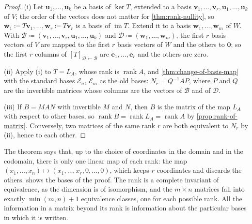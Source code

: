 \begin{proof}
(i) Let $\mathbf u_1,\ldots,\mathbf u_k$ be a basis of $\ker T$, extended to a basis $\mathbf v_1,\ldots,\mathbf v_r,\mathbf u_1,\ldots,\mathbf u_k$ of $V$; the order of the vectors does not matter for \cref{thm:rank-nullity}, so $\mathbf w_1\coloneqq T\mathbf v_1,\ldots,\mathbf w_r\coloneqq T\mathbf v_r$ is a basis of $\operatorname{im}T$. Extend it to a basis $\mathbf w_1,\ldots,\mathbf w_m$ of $W$. With $\mathcal B\coloneqq(\mathbf v_1,\ldots,\mathbf v_r,\mathbf u_1,\ldots,\mathbf u_k)$ and $\mathcal D\coloneqq(\mathbf w_1,\ldots,\mathbf w_m)$, the first $r$ basis vectors of $V$ are mapped to the first $r$ basis vectors of $W$ and the others to $\mathbf 0$; so the first $r$ columns of $[T]_{\mathcal D\leftarrow\mathcal B}$ are $\mathbf e_1,\ldots,\mathbf e_r$ and the others are zero.

(ii) Apply (i) to $T=L_A$, whose rank is $\operatorname{rank}A$, and \cref{thm:change-of-basis-map} with the standard bases $\mathcal E_n$, $\mathcal E_m$ as the old bases: $N_r=Q^{-1}AP$, where $P$ and $Q$ are the invertible matrices whose columns are the vectors of $\mathcal B$ and of $\mathcal D$.

(iii) If $B=MAN$ with invertible $M$ and $N$, then $B$ is the matrix of the map $L_A$ with respect to other bases, so $\operatorname{rank}B=\operatorname{rank}L_A=\operatorname{rank}A$ by \cref{prop:rank-of-matrix}. Conversely, two matrices of the same rank $r$ are both equivalent to $N_r$ by (ii), hence to each other.
\end{proof}

The theorem says that, up to the choice of coordinates in the domain and in the codomain, there is only one linear map of each rank: the map $(x_1,\ldots,x_n)\mapsto(x_1,\ldots,x_r,0,\ldots,0)$, which keeps $r$ coordinates and discards the others.  shows the bases of the proof. The rank is a complete invariant of equivalence, as the dimension is of isomorphism, and the $m\times n$ matrices fall into exactly $\min(m,n)+1$ equivalence classes, one for each possible rank. All the information in a matrix beyond its rank is information about the particular bases in which it is written.

